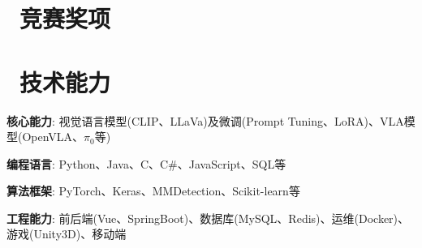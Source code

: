 \documentclass{resume}
\begin{document}
\section{\faTrophy\ 竞赛奖项}


\section{\faCode\ 技术能力}

\textbf{核心能力}: 视觉语言模型(CLIP、LLaVa)及微调(Prompt Tuning、LoRA)、VLA模型(OpenVLA、$\pi_0$等)

\textbf{编程语言}: Python、Java、C、C\#、JavaScript、SQL等

\textbf{算法框架}: PyTorch、Keras、MMDetection、Scikit-learn等

\textbf{工程能力}: 前后端(Vue、SpringBoot)、数据库(MySQL、Redis)、运维(Docker)、游戏(Unity3D)、移动端
\end{document}
